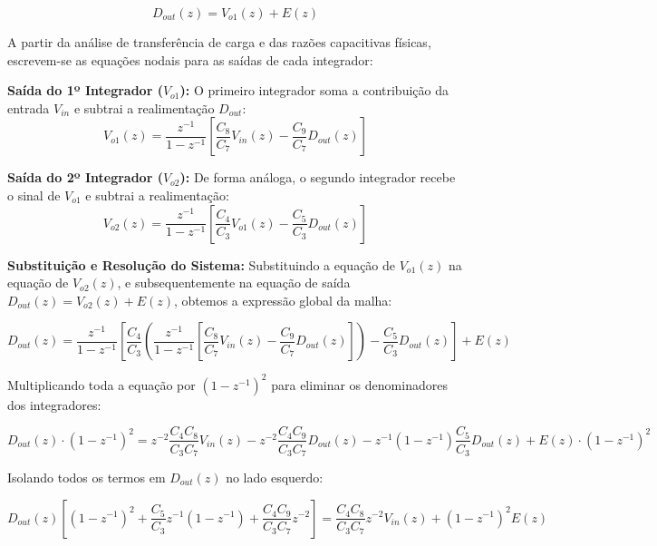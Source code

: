 \begin{equation*}
    D_{out}(z) = V_{o1}(z) + E(z)
\end{equation*}

A partir da análise de transferência de carga e das razões capacitivas físicas, escrevem-se as equações
nodais para as saídas de cada integrador:

\textbf{Saída do 1º Integrador ($V_{o1}$):}
O primeiro integrador soma a contribuição da entrada $V_{in}$ e subtrai a realimentação $D_{out}$:
\begin{equation*}
    V_{o1}(z) = \frac{z^{-1}}{1 - z^{-1}} \left[ \frac{C_8}{C_7} V_{in}(z) - \frac{C_9}{C_7} D_{out}(z) \right]
\end{equation*}

\textbf{Saída do 2º Integrador ($V_{o2}$):}
De forma análoga, o segundo integrador recebe o sinal de $V_{o1}$ e subtrai a realimentação:
\begin{equation*}
    V_{o2}(z) = \frac{z^{-1}}{1 - z^{-1}} \left[ \frac{C_4}{C_3} V_{o1}(z) - \frac{C_5}{C_3} D_{out}(z) \right]
\end{equation*}

\textbf{Substituição e Resolução do Sistema:}
Substituindo a equação de $V_{o1}(z)$ na equação de $V_{o2}(z)$, e subsequentemente na equação de
saída $D_{out}(z) = V_{o2}(z) + E(z)$, obtemos a expressão global da malha:

\begin{equation*}
    D_{out}(z) = \frac{z^{-1}}{1 - z^{-1}} \left[ \frac{C_4}{C_3} \left( \frac{z^{-1}}{1 - z^{-1}} \left[ \frac{C_8}{C_7} V_{in}(z) - \frac{C_9}{C_7} D_{out}(z) \right] \right) - \frac{C_5}{C_3} D_{out}(z) \right] + E(z)
\end{equation*}

Multiplicando toda a equação por $(1 - z^{-1})^2$ para eliminar os denominadores dos integradores:

\begin{equation*}
    D_{out}(z) \cdot (1 - z^{-1})^2 = z^{-2} \frac{C_4 C_8}{C_3 C_7} V_{in}(z) - z^{-2} \frac{C_4 C_9}{C_3 C_7} D_{out}(z) - z^{-1}(1 - z^{-1}) \frac{C_5}{C_3} D_{out}(z) + E(z) \cdot (1 - z^{-1})^2
\end{equation*}

Isolando todos os termos em $D_{out}(z)$ no lado esquerdo:

\begin{equation*}
    D_{out}(z) \left[ (1 - z^{-1})^2 + \frac{C_5}{C_3} z^{-1}(1 - z^{-1}) + \frac{C_4 C_9}{C_3 C_7} z^{-2} \right] = \frac{C_4 C_8}{C_3 C_7} z^{-2} V_{in}(z) + (1 - z^{-1})^2 E(z)
\end{equation*}

